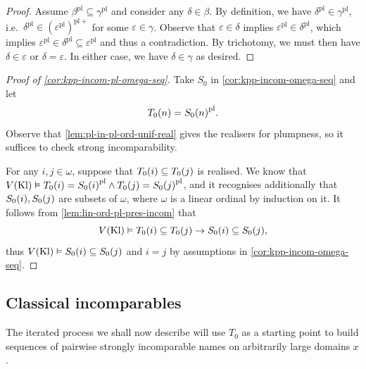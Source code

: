 \documentclass[12pt,openany]{book}
\theoremstyle{plain}
\theoremstyle{definition}
\newcommand\Kl{\mathrm{Kl}}
\newcommand\pl{\mathrm{pl}}
\newcommand\pls{{\pl +}}
\begin{document}
\begin{proof}
  Assume $\beta^\pl \subseteq \gamma^\pl$ and consider any $\delta \in \beta$. By definition, we have $\delta^\pl \in \gamma^\pl$, i.e.\ $\delta^\pl \in \left(\varepsilon^\pl\right)^\pls$ for some $\varepsilon \in \gamma$. Observe that $\varepsilon \in \delta$ implies $\varepsilon^\pl \in \delta^\pl$, which implies $\varepsilon^\pl \in \delta^\pl \subseteq \varepsilon^\pl$ and thus a contradiction. By trichotomy, we must then have $\delta \in \varepsilon$ or $\delta = \varepsilon$. In either case, we have $\delta \in \gamma$ as desired.
\end{proof}

\begin{proof}[Proof of \autoref{cor:kpp-incom-pl-omega-seq}]
  Take $S_0$ in \autoref{cor:kpp-incom-omega-seq} and let
  \[T_0\mleft(n\mright) = S_0\mleft(n\mright)^\pl.\]
  Observe that \autoref{lem:pl-in-pl-ord-unif-real} gives the realisers for plumpness, so it suffices to check strong incomparability.

  For any $i, j \in \omega$, suppose that $T_0\mleft(i\mright) \subseteq T_0\mleft(j\mright)$ is realised. We know that $V\mleft(\Kl\mright) \vDash T_0\mleft(i\mright) = S_0\mleft(i\mright)^\pl \land T_0\mleft(j\mright) = S_0\mleft(j\mright)^\pl$, and it recognises additionally that $S_0\mleft(i\mright), S_0\mleft(j\mright)$ are subsets of $\omega$, where $\omega$ is a linear ordinal by induction on it. It follows from \autoref{lem:lin-ord-pl-pres-incom} that
  \[V\mleft(\Kl\mright) \vDash T_0\mleft(i\mright) \subseteq T_0\mleft(j\mright) \rightarrow S_0\mleft(i\mright) \subseteq S_0\mleft(j\mright),\]
  thus $V\mleft(\Kl\mright) \vDash S_0\mleft(i\mright) \subseteq S_0\mleft(j\mright)$ and $i = j$ by assumptions in \autoref{cor:kpp-incom-omega-seq}.
\end{proof}

\subsection*{Classical incomparables}

The iterated process we shall now describe will use $T_0$ as a starting point to build sequences of pairwise strongly incomparable names on arbitrarily large domains $x$.
\end{document}
